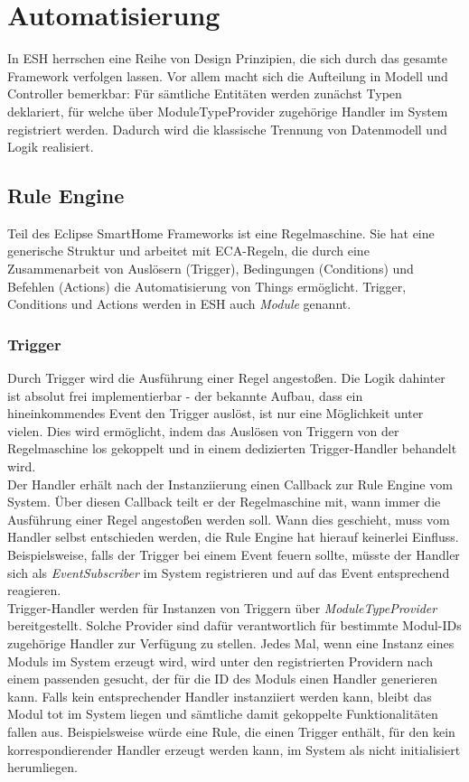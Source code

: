 \section{Automatisierung}
In ESH herrschen eine Reihe von Design Prinzipien, die sich durch das gesamte Framework verfolgen lassen. Vor allem macht sich die Aufteilung in Modell und Controller bemerkbar: Für sämtliche Entitäten werden zunächst Typen deklariert, für welche über ModuleTypeProvider zugehörige Handler im System registriert werden. Dadurch wird die klassische Trennung von Datenmodell und Logik realisiert.

\subsection{Rule Engine}
\label{sec:ruleengine}
Teil des Eclipse SmartHome Frameworks ist eine Regelmaschine. Sie hat eine generische Struktur und arbeitet mit ECA-Regeln, die durch eine Zusammenarbeit von Auslösern (Trigger), Bedingungen (Conditions) und Befehlen (Actions) die Automatisierung von Things ermöglicht. Trigger, Conditions und Actions werden in ESH auch \textit{Module} genannt.


\subsubsection{Trigger}
Durch Trigger wird die Ausführung einer Regel angestoßen. Die Logik dahinter ist absolut frei implementierbar - der bekannte Aufbau, dass ein hineinkommendes Event den Trigger auslöst, ist nur eine Möglichkeit unter vielen. Dies wird ermöglicht, indem das Auslösen von Triggern von der Regelmaschine los gekoppelt und in einem dedizierten Trigger-Handler behandelt wird. \\

Der Handler erhält nach der Instanziierung einen Callback zur Rule Engine vom System. Über diesen Callback teilt er der Regelmaschine mit, wann immer die Ausführung einer Regel angestoßen werden soll. Wann dies geschieht, muss vom Handler selbst entschieden werden, die Rule Engine hat hierauf keinerlei Einfluss. Beispielsweise, falls der Trigger bei einem Event feuern sollte, müsste der Handler sich als \textit{EventSubscriber} im System registrieren und auf das Event entsprechend reagieren.\\

Trigger-Handler werden für Instanzen von Triggern über \textit{ModuleTypeProvider} bereitgestellt. Solche Provider sind dafür verantwortlich für bestimmte Modul-IDs zugehörige Handler zur Verfügung zu stellen. Jedes Mal, wenn eine Instanz eines Moduls im System erzeugt wird, wird unter den registrierten Providern nach einem passenden gesucht, der für die ID des Moduls einen Handler generieren kann. Falls kein entsprechender Handler instanziiert werden kann, bleibt das Modul tot im System liegen und sämtliche damit gekoppelte Funktionalitäten fallen aus. Beispielsweise würde eine Rule, die einen Trigger enthält, für den kein korrespondierender Handler erzeugt werden kann, im System als \glqq nicht initialisiert\grqq{} herumliegen.

